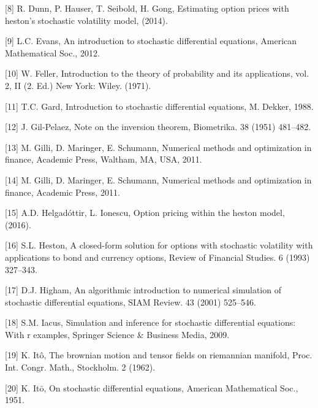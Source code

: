 \documentclass[12pt,twoside]{reedthesis}
\theoremstyle{definition}
\theoremstyle{definition}
\theoremstyle{remark}
\begin{document}
  \hypertarget{ref-dunn2014estimating}{}
  {[}8{]} R. Dunn, P. Hauser, T. Seibold, H. Gong, Estimating option
  prices with heston's stochastic volatility model, (2014).
  
  \hypertarget{ref-evans}{}
  {[}9{]} L.C. Evans, An introduction to stochastic differential
  equations, American Mathematical Soc., 2012.
  
  \hypertarget{ref-feller1971introduction}{}
  {[}10{]} W. Feller, Introduction to the theory of probability and its
  applications, vol. 2, II (2. Ed.) New York: Wiley. (1971).
  
  \hypertarget{ref-gard1988}{}
  {[}11{]} T.C. Gard, Introduction to stochastic differential equations,
  M. Dekker, 1988.
  
  \hypertarget{ref-gil1951note}{}
  {[}12{]} J. Gil-Pelaez, Note on the inversion theorem, Biometrika. 38
  (1951) 481--482.
  
  \hypertarget{ref-nmof}{}
  {[}13{]} M. Gilli, D. Maringer, E. Schumann, Numerical methods and
  optimization in finance, Academic Press, Waltham, MA, USA, 2011.
  
  \hypertarget{ref-gilli_numerical_2011}{}
  {[}14{]} M. Gilli, D. Maringer, E. Schumann, Numerical methods and
  optimization in finance, Academic Press, 2011.
  
  \hypertarget{ref-helgadottir2016option}{}
  {[}15{]} A.D. Helgadóttir, L. Ionescu, Option pricing within the heston
  model, (2016).
  
  \hypertarget{ref-heston1993closed}{}
  {[}16{]} S.L. Heston, A closed-form solution for options with stochastic
  volatility with applications to bond and currency options, Review of
  Financial Studies. 6 (1993) 327--343.
  
  \hypertarget{ref-higham2001}{}
  {[}17{]} D.J. Higham, An algorithmic introduction to numerical
  simulation of stochastic differential equations, SIAM Review. 43 (2001)
  525--546.
  
  \hypertarget{ref-iacus2009simulation}{}
  {[}18{]} S.M. Iacus, Simulation and inference for stochastic
  differential equations: With r examples, Springer Science \& Business
  Media, 2009.
  
  \hypertarget{ref-ito1962}{}
  {[}19{]} K. Itô, The brownian motion and tensor fields on riemannian
  manifold, Proc. Int. Congr. Math., Stockholm. 2 (1962).
  
  \hypertarget{ref-ito1951}{}
  {[}20{]} K. Itō, On stochastic differential equations, American
  Mathematical Soc., 1951.
  
\end{document}

